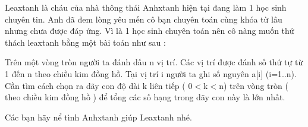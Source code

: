 Leaxtanh là cháu của nhà thông thái Anhxtanh hiện tại đang làm 1 học sinh chuyên tin. Anh đã đem lòng yêu mến cô bạn chuyên toán cùng khóa từ lâu nhưng chưa được đáp ứng. Vì là 1 học sinh chuyên toán nên cô nàng muốn thử thách leaxtanh bằng một bài toán như sau :

Trên một vòng tròn người ta đánh dấu n vị trí. Các vị trí được đánh số thứ tự từ 1 đến n theo chiều kim đồng hồ. Tại vị trí i người ta ghi số nguyên a[i] (i=1..n). Cần tìm cách chọn ra dãy con độ dài k liên tiếp ( 0$<$k$<$n) trên vòng tròn ( theo chiều kim đồng hồ ) để tổng các số hạng trong dãy con này là lớn nhất.

Các bạn hãy nể tình Anhxtanh giúp Leaxtanh nhé.

\